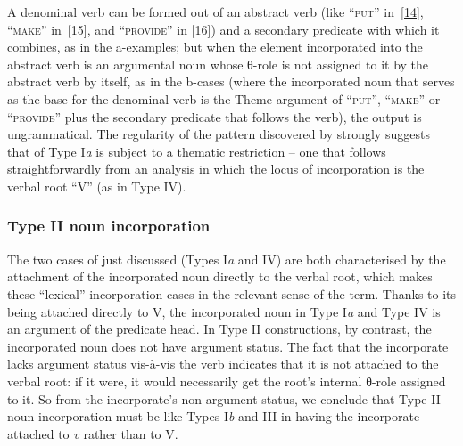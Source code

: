 \documentclass[output=paper]{langsci/langscibook}
\begin{document}
\begin{refcontext}
\ea \label{15}
    \z
\z

\ea \label{16}
    \z
\z
A denominal verb can be formed out of an abstract verb (like
\enquote{\textsc{put}} in~\eqref{14}, \enquote{\textsc{make}} in~\eqref{15},
and \enquote{\textsc{provide}} in \eqref{16}) and a secondary predicate with
which it combines, as in the a-examples; but when the element incorporated into
the abstract verb is an argumental noun whose θ{}-role is not assigned to it by
the abstract verb by itself, as in the b-cases (where the incorporated noun
that serves as the base for the denominal verb is the Theme argument of
\enquote{\textsc{put}}, \enquote{\textsc{make}} or \enquote{\textsc{provide}}
plus the secondary predicate that follows the verb), the output is
ungrammatical. The regularity of the pattern discovered by \citet{halekeyser}
strongly suggests that  of Type I\emph{a} is subject to a
thematic restriction -- one that follows straightforwardly from an analysis in
which the locus of incorporation is the verbal root \enquote{V} (as in Type
IV).

\subsubsection{Type II noun incorporation}

The two cases of  just discussed (Types I\emph{a} and IV) are
both characterised by the attachment of the incorporated noun directly to the
verbal root, which makes these \enquote{lexical} incorporation cases in the
relevant sense of the term. Thanks to its being attached directly to V, the
incorporated noun in Type I\emph{a} and Type IV is an argument of the predicate
head. In Type II constructions, by contrast, the incorporated noun does not
have argument status. The fact that the incorporate lacks argument status
vis-\`a-vis the verb indicates that it is not attached to the verbal root: if
it were, it would necessarily get the root's internal θ{}-role assigned to it.
So from the incorporate's non-argument status, we conclude that Type II noun
incorporation must be like Types I\emph{b} and III in having the incorporate
attached to \emph{v} rather than to V.


\end{refcontext}
\end{document}
